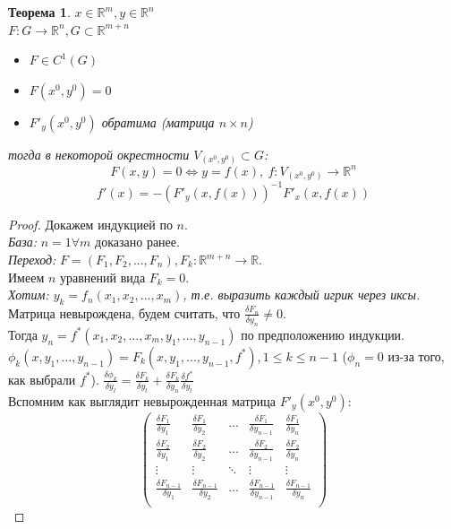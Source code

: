 \documentclass{article}
\theoremstyle{indented}
\newtheorem{theorem}{Теорема}
\theoremstyle{definition}
\theoremstyle{remark}
\newcommand{\df}[2]{\frac{\delta #1}{\delta #2}}
\begin{document}
\begin{theorem}
    $x\in \mathbb{R}^m , y \in \mathbb{R}^n$\\
    $F: G\to \mathbb{R}^n, G\subset\mathbb{R}^{m+n}$
    \begin{itemize}
        \item $F\in C^1(G)$
        \item $F(x^0,y^0)=0$
        \item $F'_y(x^0,y^0)$ обратима (матрица $n\times n$)
    \end{itemize}
    тогда в некоторой окрестности $V_{(x^0,y^0)} \subset G$: 
    $$F(x,y) = 0 \Leftrightarrow y=f(x), \ f: V_{(x^0,y^0)} \to \mathbb{R}^n$$
    $$f'(x) = -(F'_y(x,f(x)))^{-1} F'_x(x,f(x))$$
\end{theorem}


\begin{proof}
    Докажем индукцией по $n$.\\
    \textit{База: } $n=1 \forall m$ доказано ранее.\\
    \textit{Переход: } $F=(F_1, F_2, ... , F_n), F_k: \mathbb{R}^{m+n} \to \mathbb{R}$.\\
    Имеем $n$ уравнений вида $F_k = 0$.\\ 
    \textit{Хотим: $y_k=f_n(x_1, x_2, ..., x_m)$, т.е. выразить каждый игрик через иксы.}\\
    Матрица невырождена, будем считать, что $\frac{\delta F_n}{\delta y_n} \not= 0$.\\
    Тогда $y_n = f^*(x_1, x_2, ... , x_m, y_1, ... , y_{n-1})$
    по предположению индукции. \\
    $\phi_k(x,y_1, ..., y_{n-1}) = F_k(x,y_1, ..., y_{n-1}, f^*), 1 \leq k \leq n-1$ ($\phi_n = 0$ из-за того, как выбрали $f^*$).
    $\frac{\delta \phi_k}{\delta y_l} = \frac{\delta F_k}{\delta y_l} + \frac{\delta F_k}{\delta y_n} \frac{\delta f^*}{\delta y_l}$\\
    Вспомним как выглядит невырожденная матрица $F'_y(x^0, y^0)$:
    $$
    \begin{pmatrix}
        \df{F_1}{y_1} & \df{F_1}{y_2} &\ldots & \df{F_1}{y_{n-1}} & \df{F_1}{y_n}\\
        \df{F_2}{y_1} & \df{F_2}{y_2} &\ldots & \df{F_2}{y_{n-1}} & \df{F_2}{y_n}\\
        \vdots                        & \vdots                        &\ddots & \vdots                        &  \vdots                      \\
        \df{F_{n-1}}{y_1} & \df{F_{n-1}}{y_2} &\ldots & \df{F_{n-1}}{y_{n-1}} & \df{F_{n-1}}{y_n}\\

\end{pmatrix}$$
\end{proof}
\end{document}
